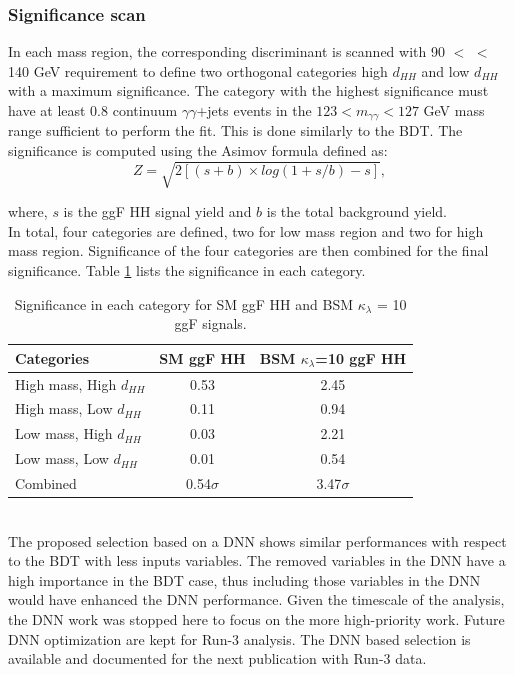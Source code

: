 \subsubsection{Significance scan}
In each mass region, the corresponding discriminant is scanned with 90 $<$ \mbb $<$ 140 GeV requirement to define two orthogonal categories high $d_{HH}$ and low $d_{HH}$ with a maximum significance. The category with the highest significance must have at least 0.8 continuum $\gamma\gamma$+jets events in the $123<m_{\gamma\gamma}<127$ GeV mass range sufficient to perform the \myy fit. This is done similarly to the BDT. The significance is computed using the Asimov formula \cite{Z} defined as: 
\begin{equation}
    Z = \sqrt{2\left[(s+b)\times log(1+s/b)-s\right]},
\end{equation}

where, $s$ is the ggF HH signal yield and $b$ is the total background yield. \\
In total, four categories are defined, two for low mass region and two for high mass region. Significance of the four categories are then combined for the final significance. Table \ref{tab:Sig} lists the significance in each category.
\begin{table}[htbp]
    \centering
    \begin{tabular}{lcc}
        \hline\hline
        Categories & SM ggF HH & BSM $\kappa_\lambda$=10 ggF HH \\
        \hline
        High mass, High $d_{HH}$ & 0.53 & 2.45 \\
        High mass, Low $d_{HH}$ & 0.11 & 0.94 \\
        Low mass, High $d_{HH}$ & 0.03 & 2.21 \\
        Low mass, Low $d_{HH}$ & 0.01 & 0.54 \\
        \hline
        Combined & 0.54$\sigma$ & 3.47$\sigma$ \\
        \hline
        \hline
    \end{tabular}
    \begin{tcolorbox}[colback=black!5!white, colframe=white!75!black]
    \caption{Significance in each category for SM ggF HH and BSM $\kappa_\lambda$ = 10 ggF signals.}
    \label{tab:Sig}
    \end{tcolorbox}
    
\end{table}
\\
The proposed selection based on a DNN shows similar performances with respect to the BDT with less inputs variables. The removed variables in the DNN have a high importance in the BDT case, thus including those variables in the DNN would have enhanced the DNN performance. Given the timescale of the analysis, the DNN work was stopped here to focus on the more high-priority work. Future DNN optimization are kept for Run-3 analysis. The DNN based selection is available and documented for the next publication with Run-3 data. \\

